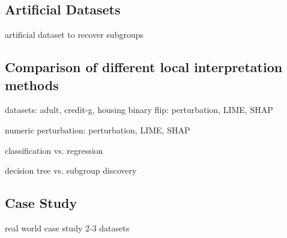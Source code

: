 
\subsection{Artificial Datasets}
artificial dataset to recover subgroups 

\subsection{Comparison of different local interpretation methods}

datasets: adult, credit-g, housing
binary flip: perturbation, LIME, SHAP

numeric perturbation: perturbation, LIME, SHAP

classification vs. regression

decision tree vs. subgroup discovery

\subsection{Case Study}

real world case study 2-3 datasets